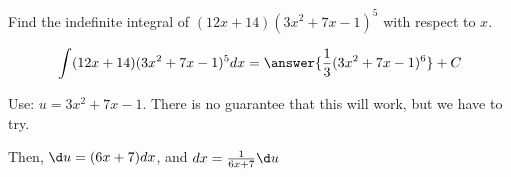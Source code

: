 \documentclass{ximera}
\author{Gregory Hartman \and Matthew Carr\and Nela Lakos}
\begin{document}
\begin{exercise}


Find the indefinite integral of $(12 x+14)(3 x^2+7 x-1)^5$ with respect to $x$.

\[
\int (12 x+14)(3 x^2+7 x-1)^5 dx=\answer{\frac{1}{3} (3x^2+7x-1)^6}+C
\]

\begin{hint}
Use: $u=3 x^2+7 x-1$. There is no guarantee that this will work, but we have to try.
\end{hint}
\begin{hint}
Then, $\d u=(6 x+7) dx $, and  $dx=\frac{1}{6 x+7}\d u $
\end{hint}
\end{exercise}
\end{document}
